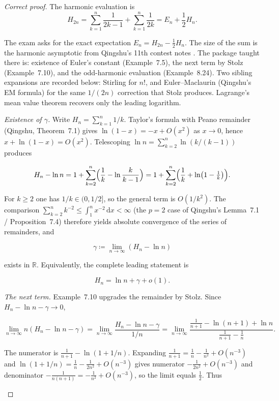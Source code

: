 \documentclass[11pt,a4paper]{article}
\begin{document}
\begin{proof}[Correct proof]
The harmonic evaluation is
\[
H_{2n}
=
\sum_{k=1}^{n}\frac{1}{2k-1}
+
\sum_{k=1}^{n}\frac{1}{2k}
=
E_{n}
+
\frac12 H_{n}.
\]

\begin{remark}
\label{rem:p3-qingshu-mvt}
The exam asks for the exact expectation \(E_{n}=H_{2n}-\tfrac12 H_{n}\). The size of the sum is the harmonic asymptotic from Qingshu's 11th contest notes \citep{qingshu11}. The package taught there is: existence of Euler's constant (Example~7.5), the next term by Stolz (Example~7.10), and the odd-harmonic evaluation (Example~8.24). Two sibling expansions are recorded below: Stirling for \(n!\), and Euler--Maclaurin (Qingshu's EM formula) for the same \(1/(2n)\) correction that Stolz produces. Lagrange's mean value theorem recovers only the leading logarithm.

\emph{Existence of \(\gamma\).} Write \(H_{n}=\sum_{k=1}^{n}1/k\). Taylor's formula with Peano remainder (Qingshu, Theorem~7.1) gives \(\ln(1-x)=-x+O(x^{2})\) as \(x\to 0\), hence \(x+\ln(1-x)=O(x^{2})\). Telescoping \(\ln n=\sum_{k=2}^{n}\ln(k/(k-1))\) produces

\[
H_{n}-\ln n
=
1+\sum_{k=2}^{n}\Bigl(\frac{1}{k}-\ln\frac{k}{k-1}\Bigr)
=
1+\sum_{k=2}^{n}\Bigl(\frac{1}{k}+\ln\bigl(1-\tfrac{1}{k}\bigr)\Bigr).
\]

For \(k\ge 2\) one has \(1/k\in(0,1/2]\), so the general term is \(O(1/k^{2})\). The comparison \(\sum_{k=2}^{n}k^{-2}\le\int_{1}^{n}x^{-2}\,\mathrm{d}x<\infty\) (the \(p=2\) case of Qingshu's Lemma~7.1 / Proposition~7.4) therefore yields absolute convergence of the series of remainders, and

\[
\gamma
\coloneqq
\lim_{n\to\infty}(H_{n}-\ln n)
\]

exists in \(\mathbb{R}\). Equivalently, the complete leading statement is

\[
H_{n}
=
\ln n+\gamma+o(1).
\]

\emph{The next term.} Example~7.10 upgrades the remainder by Stolz. Since \(H_{n}-\ln n-\gamma\to 0\),

\[
\lim_{n\to\infty}n(H_{n}-\ln n-\gamma)
=
\lim_{n\to\infty}
\frac{H_{n}-\ln n-\gamma}{1/n}
=
\lim_{n\to\infty}
\frac{\frac{1}{n+1}-\ln(n+1)+\ln n}{\frac{1}{n+1}-\frac{1}{n}}.
\]

The numerator is \(\frac{1}{n+1}-\ln(1+1/n)\). Expanding \(\frac{1}{n+1}=\frac{1}{n}-\frac{1}{n^{2}}+O(n^{-3})\) and \(\ln(1+1/n)=\frac{1}{n}-\frac{1}{2n^{2}}+O(n^{-3})\) gives numerator \(-\frac{1}{2n^{2}}+O(n^{-3})\) and denominator \(-\frac{1}{n(n+1)}=-\frac{1}{n^{2}}+O(n^{-3})\), so the limit equals \(\frac12\). Thus


\end{remark}
\end{proof}
\end{document}
